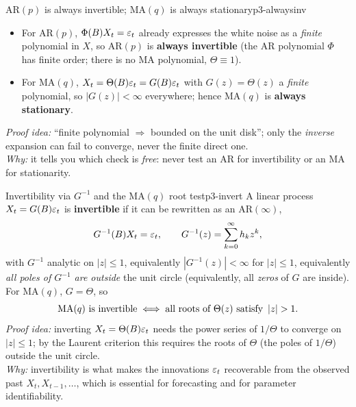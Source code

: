\begin{proposition}{$\mathrm{AR}(p)$ is always invertible; $\mathrm{MA}(q)$ is always stationary}{p3-alwaysinv}
\begin{itemize}
  \item For $\mathrm{AR}(p)$, $\Phi(B)X_t=\varepsilon_t$ already expresses the white
        noise as a \emph{finite} polynomial in $X$, so $\mathrm{AR}(p)$ is
        \textbf{always invertible} (the AR polynomial $\Phi$ has finite order;
        there is no MA polynomial, $\Theta\equiv1$).
  \item For $\mathrm{MA}(q)$, $X_t=\Theta(B)\varepsilon_t=G(B)\varepsilon_t$ with
        $G(z)=\Theta(z)$ a \emph{finite} polynomial, so $|G(z)|<\infty$
        everywhere; hence $\mathrm{MA}(q)$ is \textbf{always stationary}.
\end{itemize}
\textit{Proof idea:} ``finite polynomial $\Rightarrow$ bounded on the unit
disk''; only the \emph{inverse} expansion can fail to converge, never the
finite direct one.\\
\textit{Why:} it tells you which check is \emph{free}: never test an AR for
invertibility or an MA for stationarity.
\end{proposition}

\begin{proposition}{Invertibility via $G^{-1}$ and the $\mathrm{MA}(q)$ root test}{p3-invert}
A linear process $X_t=G(B)\varepsilon_t$ is \textbf{invertible} if it can be
rewritten as an $\mathrm{AR}(\infty)$,
\[
G^{-1}(B)X_t=\varepsilon_t,\qquad G^{-1}(z)=\sum_{k=0}^{\infty}h_k z^{k},
\]
with $G^{-1}$ analytic on $|z|\le1$, equivalently $|G^{-1}(z)|<\infty$ for
$|z|\le1$, equivalently \emph{all poles of $G^{-1}$ are outside} the unit circle
(equivalently, all \emph{zeros} of $G$ are inside). For $\mathrm{MA}(q)$,
$G=\Theta$, so
\[
\mathrm{MA}(q)\ \text{is invertible}\iff \text{all roots of }\Theta(z)\ \text{satisfy }\left\lvert z \right\rvert>1 .
\]
\textit{Proof idea:} inverting $X_t=\Theta(B)\varepsilon_t$ needs the power series of
$1/\Theta$ to converge on $|z|\le1$; by the Laurent criterion this requires the
roots of $\Theta$ (the poles of $1/\Theta$) outside the unit circle.\\
\textit{Why:} invertibility is what makes the innovations $\varepsilon_t$ recoverable
from the observed past $X_t,X_{t-1},\dots$, which is essential for forecasting
and for parameter identifiability.
\end{proposition}

